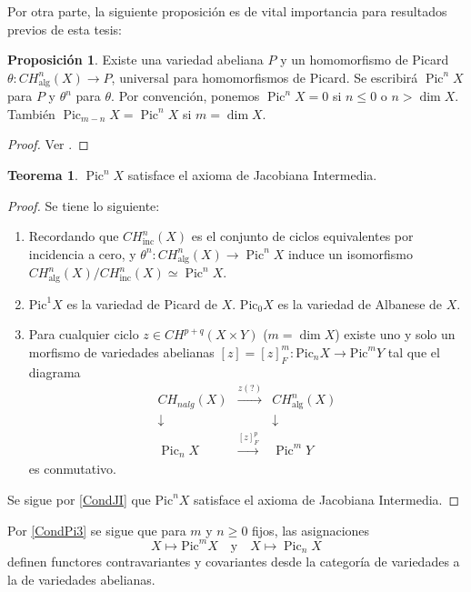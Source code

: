 \documentclass[10pt]{amsart}
\theoremstyle{definition}
\newtheorem{theorem}[definition]{Teorema}
\newtheorem{proposition}[definition]{Proposici\'on}
\theoremstyle{remark}
\theoremstyle{definition}
\begin{document}
Por otra parte, la siguiente proposición es de vital importancia para resultados previos de esta tesis:

\begin{proposition}
 Existe una variedad abeliana \(P\) y un homomorfismo de Picard \(\theta: CH_{\mathrm{alg}}^n(X) \to P\), universal para homomorfismos de Picard. Se escribirá \(\operatorname{Pic}^n X\) para \(P\) y \(\theta^n\) para \(\theta\). Por convención, ponemos \(\operatorname{Pic}^n X = 0\) si \(n \leq 0\) o \(n > \dim X\). También \(\operatorname{Pic}_{m-n} X = \operatorname{Pic}^n X\) si \(m = \dim X\).
\end{proposition}

\begin{proof}
Ver \cite[Prop. 3.5]{Sai79}.
\end{proof}

\begin{theorem}
\(\operatorname{Pic}^n X\) satisface el axioma de Jacobiana Intermedia. 
\begin{proof}
Se tiene lo siguiente:
\begin{enumerate}
\item Recordando que $CH_{\mathrm{inc}}^n(X)$ es el conjunto de ciclos equivalentes por incidencia a cero, y \(\theta^n: CH_{\mathrm{alg}}^n(X) \to \operatorname{Pic}^n X\) induce un isomorfismo \(CH_{\mathrm{alg}}^n(X) / CH_{\mathrm{inc}}^n(X) \simeq \operatorname{Pic}^n X\).
\item\label{CondPi1} \(\mathrm{Pic}^1 X\) es la variedad de Picard de \(X\). \(\mathrm{Pic}_0 X\) es la variedad de Albanese de \(X\).
\item\label{CondPi2}  Para cualquier ciclo \(z \in CH^{p+q}(X \times Y)\) (\(m = \dim X\)) existe uno y solo un morfismo de variedades abelianas \([z] = [z]_F^m: \mathrm{Pic}_n X \to \mathrm{Pic}^m Y\) tal que el diagrama
\[
\begin{array}{ccc}
CH_{n alg}(X)  & \xrightarrow{z(?)} & CH_{\mathrm{alg}}^n(X)  \\
\downarrow & & \downarrow \\
\operatorname{Pic}_n X & \xrightarrow{[z]_F^p} & \operatorname{Pic}^m Y
\end{array}
\]\label{CondPi3}
es conmutativo.
\end{enumerate}
Se sigue por \ref{CondJI} que $\mathrm{Pic}^n X$ satisface el axioma de Jacobiana Intermedia.
\end{proof}
\end{theorem}

Por \ref{CondPi3} se sigue que para \(m\) y \(n \geq 0\) fijos, las asignaciones
\[
X \mapsto \mathrm{Pic}^m X \quad \text{y} \quad X \mapsto \operatorname{Pic}_n X
\]
definen functores contravariantes y covariantes desde la categoría de variedades a la de variedades abelianas.
\end{document}
